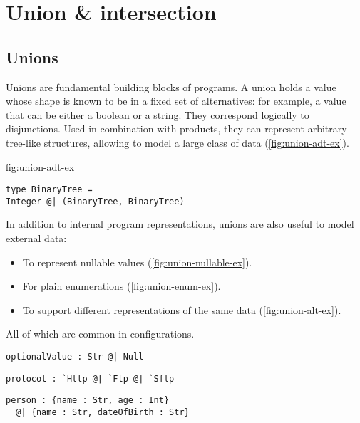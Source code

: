 \documentclass[sigplan,10pt,review,anonymous]{acmart}
\newcommand{\info}[2][1=]{}
\newcommand{\change}[2]{}
\begin{document}
\newpage

\section{Union \& intersection}
\label{sec:union-inter}
\info{What are they, what are they used for.}

\subsection*{Unions}
Unions are fundamental building blocks of programs. A union holds a value whose
shape is known to be in a fixed set of alternatives: for example, a value that
can be either a boolean or a string. They correspond logically to disjunctions.
Used in combination with products, they can represent arbitrary tree-like
structures, allowing to model a large class of data
(\ref{fig:union-adt-ex}).


\change{These next few labels need to be inside figures,
they are not working}
\label{fig:union-adt-ex}
\begin{lstlisting}[title={Tree-like data structure}]
type BinaryTree =
Integer @| (BinaryTree, BinaryTree)
\end{lstlisting}


In addition to internal program representations, unions are also useful to model
external data:
\begin{itemize}
    \item To represent nullable values (\ref{fig:union-nullable-ex}).
    \item For plain enumerations (\ref{fig:union-enum-ex}).
    \item To support different representations of the same data
        (\ref{fig:union-alt-ex}).
\end{itemize}
All of which are common in configurations.

\label{fig:union-nullable-ex}
\begin{lstlisting}[title={Nullable values}]
optionalValue : Str @| Null
\end{lstlisting}

\label{fig:union-enum-ex}
\begin{lstlisting}[title={Plain enumeration}]
protocol : `Http @| `Ftp @| `Sftp
\end{lstlisting}

\label{fig:union-alt-ex}
\begin{lstlisting}[title={Alternative representations}]
person : {name : Str, age : Int}
  @| {name : Str, dateOfBirth : Str}
\end{lstlisting}
\end{document}
